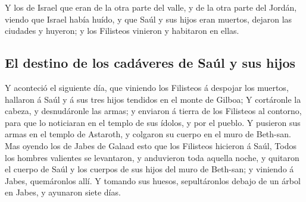  Y los de Israel que eran de la otra parte del valle, y de
la otra parte del Jordán, viendo que Israel había huído, y que Saúl y
sus hijos eran muertos, dejaron las ciudades y huyeron; y los Filisteos
vinieron y habitaron en ellas.

\hypertarget{el-destino-de-los-caduxe1veres-de-sauxfal-y-sus-hijos}{%
\subsection{El destino de los cadáveres de Saúl y sus
hijos}\label{el-destino-de-los-caduxe1veres-de-sauxfal-y-sus-hijos}}

 Y aconteció el siguiente día, que viniendo los Filisteos á
despojar los muertos, hallaron á Saúl y á sus tres hijos tendidos en el
monte de Gilboa;  Y cortáronle la cabeza, y desnudáronle las
armas; y enviaron á tierra de los Filisteos al contorno, para que lo
noticiaran en el templo de sus ídolos, y por el pueblo.  Y
pusieron sus armas en el templo de Astaroth, y colgaron su cuerpo en el
muro de Beth-san.  Mas oyendo los de Jabes de Galaad esto
que los Filisteos hicieron á Saúl,  Todos los hombres
valientes se levantaron, y anduvieron toda aquella noche, y quitaron el
cuerpo de Saúl y los cuerpos de sus hijos del muro de Beth-san; y
viniendo á Jabes, quemáronlos allí.  Y tomando sus huesos,
sepultáronlos debajo de un árbol en Jabes, y ayunaron siete días.
